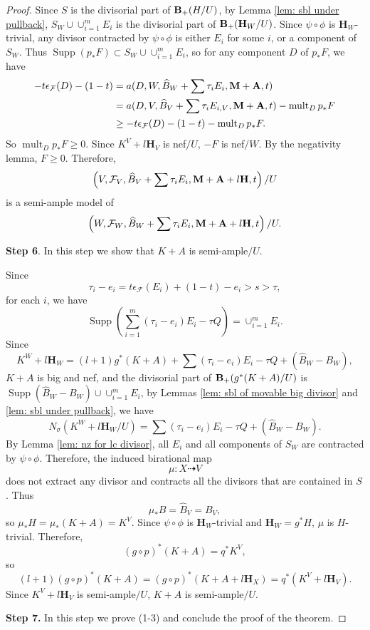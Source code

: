 \documentclass[12pt]{amsart}
\newcommand{\calum}[1]{{\textcolor{blue}{[Calum: #1]}}}
\numberwithin{equation}{section}
\newcommand{\Mm}{{\bf{M}}}
\newcommand{\Hh}{\mathbf{H}}
\newcommand{\Supp}{\operatorname{Supp}}
\newcommand{\mult}{\operatorname{mult}}
\newcommand{\Aa}{{\bf{A}}}
\newcommand{\Bb}{{\bf{B}}}
\newcommand{\Ff}{\mathcal{F}}
\theoremstyle{definition}
\theoremstyle{definition}
\theoremstyle{definition}
\begin{document}
\begin{proof}
Since $S$ is the divisorial part of $\Bb_+(H/U)$, by Lemma \ref{lem: sbl under pullback}, $S_W\cup\cup_{i=1}^mE_i$ is the divisorial part of $\Bb_+(\Hh_W/U)$. Since  $\psi\circ\phi$ is $\Hh_W$-trivial, any divisor contracted by  $\psi\circ\phi$ is either $E_i$ for some $i$, or a component of $S_W$. Thus $\Supp(p_\ast F)\subset S_W\cup\cup_{i=1}^mE_i$, so for any component $D$ of $p_\ast F$, we have
\begin{align*}
  -t\epsilon_{\Ff}(D)-(1-t)&=a(D,W,\widehat B_W+\sum\tau_iE_i,\Mm+\Aa,t)\\
  &=a(D,V,\widehat B_V+\sum\tau_iE_{i,V},\Mm+\Aa,t)-\mult_Dp_\ast F\\
  &\geq -t\epsilon_{\Ff}(D)-(1-t)-\mult_Dp_\ast F.
\end{align*}
So $\mult_Dp_\ast F\geq 0$. Since $K^V+l\Hh_V$ is nef$/U$, $-F$ is nef$/W$. By the negativity lemma, $F\geq 0$. Therefore,
$$\left(V,\Ff_V,\widehat{B}_V+\sum\tau_iE_i,\Mm+\Aa+l\Hh,t\right)/U$$
is a semi-ample model of 
$$\left(W,\Ff_W,\widehat{B}_W+\sum\tau_iE_i,\Mm+\Aa+l\Hh,t\right)/U.$$
\medskip

\noindent\textbf{Step 6}. In this step we show that $K+A$ is semi-ample$/U$.

Since
$$\tau_i-e_i=t\epsilon_{\Ff}(E_i)+(1-t)-e_i>s>\tau,$$
for each $i$, we have
$$\Supp\left(\sum_{i=1}^m(\tau_i-e_i)E_i-\tau Q\right)=\cup_{i=1}^mE_i.$$
Since
$$K^W+l\Hh_W=(l+1)g^\ast (K+A)+\sum(\tau_i-e_i)E_i-\tau Q+(\widehat{B}_W-B_W),$$
$K+A$ is big and nef, and the divisorial part of $\Bb_+(g^\ast (K+A)/U)$ is $\Supp(\widehat{B}_W-B_W)\cup\cup_{i=1}^mE_i$, by Lemmas \ref{lem: sbl of movable big divisor} and \ref{lem: sbl under pullback},
we have
$$N_{\sigma}(K^W+l\Hh_W/U)=\sum(\tau_i-e_i)E_i-\tau Q+(\widehat{B}_W-B_W).$$
By Lemma \ref{lem: nz for lc divisor}, all $E_i$ and all components of $S_W$ are contracted by $\psi\circ\phi$. Therefore, the induced birational map
$$\mu: X\dashrightarrow V$$
does not extract any divisor and contracts all the divisors that are contained in $S$. Thus 
$$\mu_\ast B=\widehat{B}_V=B_V,$$
so $\mu_\ast H=\mu_\ast (K+A)=K^V$. Since $\psi\circ\phi$ is $\Hh_W$-trivial and $\Hh_W=g^\ast H$, $\mu$ is $H$-trivial. Therefore,
$$(g\circ p)^\ast (K+A)=q^\ast K^V,$$
so
$$(l+1)(g\circ p)^\ast (K+A)=(g\circ p)^\ast (K+A+l\Hh_X)=q^\ast (K^V+l\Hh_V).$$
Since $K^V+l\Hh_V$ is semi-ample$/U$, $K+A$ is semi-ample$/U$.

\medskip

\noindent\textbf{Step 7.} In this step we prove (1-3) and conclude the proof of the theorem.


\end{proof}
\end{document}
